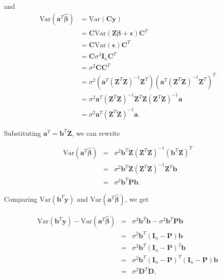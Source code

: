 \documentclass[
]{book}
\begin{document}
and\\

\begin{align*}
\text{Var}(\mathbf{a}^T\mathbf{\hat{\beta}}) &= \text{Var}(\mathbf{C}\mathbf{y}) \\
&= \mathbf{C}\text{Var}(\mathbf{Z}\mathbf{\beta}+\mathbf{\epsilon})\mathbf{C}^T \\
&= \mathbf{C}\text{Var}(\mathbf{\epsilon})\mathbf{C}^T \\
&= \mathbf{C} \sigma^2 \mathbf{I}_n \mathbf{C}^T \\
&= \sigma^2 \mathbf{C}\mathbf{C}^T \\
&= \sigma^2 (\mathbf{a}^T(\mathbf{Z}^T\mathbf{Z})^{-1}\mathbf{Z}^T) (\mathbf{a}^T(\mathbf{Z}^T\mathbf{Z})^{-1}\mathbf{Z}^T)^T \\
&= \sigma^2 \mathbf{a}^T(\mathbf{Z}^T\mathbf{Z})^{-1}\mathbf{Z}^T\mathbf{Z}(\mathbf{Z}^T\mathbf{Z})^{-1}\mathbf{a} \\
&= \sigma^2 \mathbf{a}^T(\mathbf{Z}^T\mathbf{Z})^{-1}\mathbf{a}.
\end{align*}

Substituting \(\mathbf{a}^T=\mathbf{b}^T\mathbf{Z}\), we can rewrite

\begin{eqnarray*}
\text{Var}(\mathbf{a}^T\mathbf{\hat{\beta}})
&=& \sigma^2 \mathbf{b}^T\mathbf{Z}(\mathbf{Z}^T\mathbf{Z})^{-1}(\mathbf{b}^T\mathbf{Z})^T \\
&=& \sigma^2 \mathbf{b}^T\mathbf{Z}(\mathbf{Z}^T\mathbf{Z})^{-1}\mathbf{Z}^T\mathbf{b} \\
&=& \sigma^2\mathbf{b}^T\mathbf{P}\mathbf{b}.
\end{eqnarray*}

Comparing \(\text{Var}(\mathbf{b}^T\mathbf{y})\) and \(\text{Var}(\mathbf{a}^T\mathbf{\hat{\beta}})\), we get

\begin{eqnarray*}
\text{Var}(\mathbf{b}^T\mathbf{y}) - \text{Var}(\mathbf{a}^T\mathbf{\hat{\beta}})
&=& \sigma^2 \mathbf{b}^T\mathbf{b} - \sigma^2 \mathbf{b}^T\mathbf{P}\mathbf{b} \\
&=& \sigma^2 \mathbf{b}^T (\mathbf{I}_n-\mathbf{P})\mathbf{b} \\
&=& \sigma^2 \mathbf{b}^T(\mathbf{I}_n-\mathbf{P})^2\mathbf{b} \\
&=& \sigma^2 \mathbf{b}^T(\mathbf{I}_n-\mathbf{P})^T (\mathbf{I}_n-\mathbf{P})\mathbf{b} \\
&=& \sigma^2 \mathbf{D}^T\mathbf{D},
\end{eqnarray*}
\end{document}
